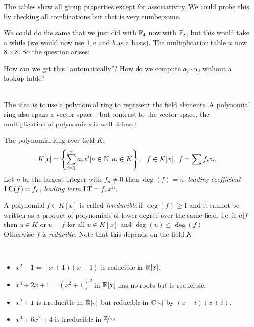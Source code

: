 The tables show all group properties except for associativity. We could probe this by checking all combinations but that is very cumbersome.


We could do the same that we just did with $\mathbb{F}_4$ now with $\mathbb{F}_8$, but this would take a while (we would now use $1, a$ and $b$ as a basis). The multiplication table is now $8 \times 8$. So the question arises: \\

\begin{problem}
How can we get this ``automatically''? How do we compute $\alpha_i \cdot \alpha_j$ without a lookup table?
\end{problem} 
\ \\
The idea is to use a polynomial ring to represent the field elements. A polynomial ring also spans a vector space - but contrast to the vector space, the multiplication of polynomials is well defined.

The polynomial ring over field $K$:
\[
	K[x] = \left\{\sum\limits_{i=1}^n a_i x^i | n \in \mathbb{N}, a_i \in K \right\}, \,\,\,\, f \in K[x], \,\, f = \sum f_i x_i.
\]
Let $n$ be the largest integer with $f_n \neq 0$ then $\deg(f) =n$, \emph{leading coefficient} $\operatorname{LC}(f) = f_n$, \emph{leading term} $\operatorname{LT} = f_x x^n$.

\begin{definition}[Irreducible]
A polynomial $f \in K[x]$ is called \emph{irreducible} if $\deg(f) \geq 1$ and it cannot be written as a product of polynomials of lower degree over the same field, i.e. if $u|f$ then $u \in K$ or $u = f$ for all $u \in K[x]$ and $\deg(u) \leq \deg(f)$ \\
Otherwise $f$ is \emph{reducible}. Note that this depends on the field $K$.
\end{definition}

\begin{example} \ \\
\begin{itemize}
\item $x^2-1 = (x+1)(x-1)$ is reducible in $\mathbb{R}[x]$.
\item $x^4 + 2x +1 = (x^2 + 1)^2$ in $\mathbb{R}[x]$ has no roots but is reducible.
\item $x^2 +1$ is irreducible in $\mathbb{R}[x]$ but reducible in $\mathbb{C}[x]$ by $(x-i)(x+i)$.
\item $x^3+6x^2+4$ is irreducible in $\nicefrac{\mathbb{Z}}{7 \mathbb{Z}}$
\end{itemize}
\end{example}

